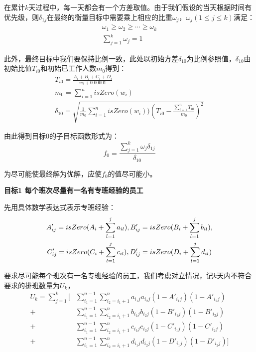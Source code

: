 \documentclass{article}
\begin{document}
	在累计$k$天过程中，每一天都会有一个方差取值。由于我们假设的当天根据时间有优先级，则$\delta_{1j}$在最终的衡量目标中需要乘上相应的比重$\omega_{j}$，$\omega_{j}(1\leq j \leq k)$满足：
	\begin{gather}
		\omega_{1}\geq \omega_{2} \geq \cdots \geq \omega_{k}\\
		\sum_{j=1}^{k}\omega_{j}=1
	\end{gather}
	
	此外，最终目标中我们要保持比例一致，此处以初始方差$\delta_{10}$为比例参照值，$\delta_{10}$由初始比值$T_{i0}$和初始已工作人数$m_{0}$得到：
	\begin{gather}
		T_{i0}=\frac{A_i+B_i+C_i+D_i}{w_i+0.00001}\\
		m_{0}=\sum_{i=1}^{n}isZero(w_i)\\
		\delta_{10}=\sqrt{\frac{1}{m_0}\sum_{i=1}^{n}isZero(w_i))(T_{i0}-\frac{\sum_{i=1}^{n}T_{i0}}{m_{0}})^2}
	\end{gather}
	
	由此得到目标0的子目标函数形式为：
	\begin{equation}
		f_0=\frac{\sum_{j=1}^{k}\omega_{j}\delta_{1j}}{\delta_{10}}
	\end{equation}
	
	为尽可能使最终解为优解，应使$f_0$的值尽可能小。
	
	\textbf{目标1 \quad 每个班次尽量有一名有专班经验的员工}
	
	先用具体数学表达式表示专班经验：
	\begin{gather}
		A'_{ij}=isZero(A_i+\sum_{l=1}^ja_{il}),B'_{ij}=isZero(B_i+\sum_{l=1}^jb_{il}), \notag\\
		C'_{ij}=isZero(C_i+\sum_{l=1}^jc_{il}),D'_{ij}=isZero(D_i+\sum_{l=1}^jd_{il})
	\end{gather}
	
	要求尽可能每个班次有一名专班经验的员工，我们考虑对立情况，记$k$天内不符合要求的排班数量为$U_{k}$，
	\begin{equation}
		\begin{aligned}
			U_{k}=\sum_{j=1}^{k}[&\sum_{i_1=1}^{n-1}\sum_{i_2=i_1+1}^{n}a_{i_1j}a_{i_2j}(1-A'_{i_1j})(1-A'_{i_2j})\\
			+&\sum_{i_1=1}^{n-1}\sum_{i_2=i_1+1}^{n}b_{i_1j}b_{i_2j}(1-B'_{i_1j})(1-B'_{i_2j})\\
			+&\sum_{i_1=1}^{n-1}\sum_{i_2=i_1+1}^{n}c_{i_1j}c_{i_2j}(1-C'_{i_1j})(1-C'_{i_2j})\\
			+&\sum_{i_1=1}^{n-1}\sum_{i_2=i_1+1}^{n}d_{i_1j}d_{i_2j}(1-D'_{i_1j})(1-D'_{i_2j})]
		\end{aligned}	
	\end{equation}
	
\end{document}
